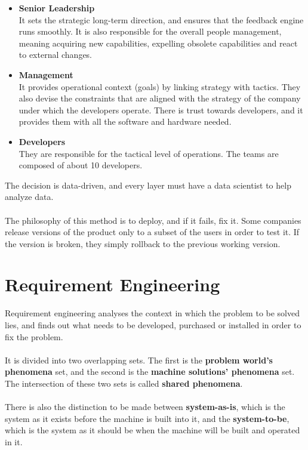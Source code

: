 \documentclass{article}
\begin{document}
\begin{itemize}
	\item \textbf{Senior Leadership}
	\vspace{.2cm} \\
	It sets the strategic long-term direction, and ensures that the feedback engine runs smoothly. It is also responsible for the overall people management, meaning acquiring new capabilities, expelling obsolete capabilities and react to external changes.
	
	\item \textbf{Management}
	\vspace{.2cm} \\
	It provides operational context (goals) by linking strategy with tactics. They also devise the constraints that are aligned with the strategy of the company under which the developers operate. There is trust towards developers, and it provides them with all the software and hardware needed.
	
	\item \textbf{Developers}
	\vspace{.2cm} \\
	They are responsible for the tactical level of operations. The teams are composed of about 10 developers.
\end{itemize}
The decision is data-driven, and every layer must have a data scientist to help analyze data. \\ \\
The philosophy of this method is to deploy, and if it fails, fix it. Some companies release versions of the product only to a subset of the users in order to test it. If the version is broken, they simply rollback to the previous working version.

\section{Requirement Engineering}
Requirement engineering analyses the context in which the problem to be solved lies, and finds out what needs to be developed, purchased or installed in order to fix the problem. \\ \\
It is divided into two overlapping sets. The first is the \textbf{problem world's phenomena} set, and the second is the \textbf{machine solutions' phenomena} set. The intersection of these two sets is called \textbf{shared phenomena}. \\ \\
There is also the distinction to be made between \textbf{system-as-is}, which is the system as it exists before the machine is built into it, and the \textbf{system-to-be}, which is the system as it should be when the machine will be built and operated in it.
\end{document}
